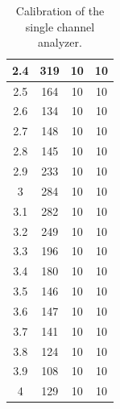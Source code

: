 \documentclass[a4paper]{report}
\numberwithin{equation}{section}
\begin{document}
\begin{table}[!ht]
\begin{tabular}{|c|c|c|c|}
        2.4 & 319 & 10 & 10 \\ \hline
        2.5 & 164 & 10 & 10 \\ \hline
        2.6 & 134 & 10 & 10 \\ \hline
        2.7 & 148 & 10 & 10 \\ \hline
        2.8 & 145 & 10 & 10 \\ \hline
        2.9 & 233 & 10 & 10 \\ \hline
        3 & 284 & 10 & 10 \\ \hline
        3.1 & 282 & 10 & 10 \\ \hline
        3.2 & 249 & 10 & 10 \\ \hline
        3.3 & 196 & 10 & 10 \\ \hline
        3.4 & 180 & 10 & 10 \\ \hline
        3.5 & 146 & 10 & 10 \\ \hline
        3.6 & 147 & 10 & 10 \\ \hline
        3.7 & 141 & 10 & 10 \\ \hline
        3.8 & 124 & 10 & 10 \\ \hline
        3.9 & 108 & 10 & 10 \\ \hline
        4 & 129 & 10 & 10 \\ \hline
    \end{tabular}
    \caption{Calibration of the single channel analyzer.}
    \label{calibration}
\end{table}
\end{document}
